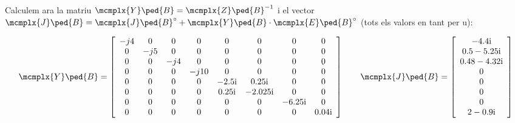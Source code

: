 \begin{exemple}
    Calculem ara la matriu $\mcmplx{Y}\ped{B}=\mcmplx{Z}\ped{B}^{-1}$ i el vector $\mcmplx{J}\ped{B} = \mcmplx{J}\ped{B}^\circ + \mcmplx{Y}\ped{B} \cdot\mcmplx{E}\ped{B}^\circ$  (tots els valors en tant per u):

    \[
       \mcmplx{Y}\ped{B} =
       \begin{bmatrix}\begin{array}{cccccccc}
         -j 4 & 0 & 0 & 0 & 0 & 0 & 0 & 0 \\
         0 & -j 5 & 0 & 0 & 0 & 0 & 0 & 0 \\
         0 & 0 & -j 4 & 0 & 0 & 0 & 0 & 0 \\
         0 & 0 & 0 & -j 10 & 0 & 0 & 0 & 0 \\
         0 & 0 & 0 & 0 & \complexnum{-j 2,5} & \complexnum{j 0,25} & 0 & 0 \\
         0 & 0 & 0 & 0 & \complexnum{j 0,25} & \complexnum{-j 2,025} & 0 & 0 \\
         0 & 0 & 0 & 0 & 0 & 0 & \complexnum{-j 6,25} & 0 \\
         0 & 0 & 0 & 0 & 0 & 0 & 0 & \complexnum{j 0,04}
    \end{array}\end{bmatrix}
       \qquad
       \mcmplx{J}\ped{B} =
       \begin{bmatrix}\begin{array}{c}
        \complexnum{-j 4,4} \\
        \complexnum{0,5 - j 5,25} \\
        \complexnum{0,48 - j 4,32} \\
        0 \\
        0 \\
        0 \\
        0 \\
        \complexnum{2 - j 0,9}
    \end{array}\end{bmatrix}
    \]


\end{exemple}
